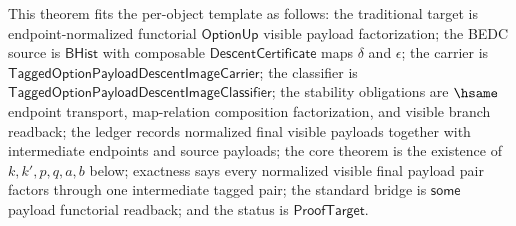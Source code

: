 \begin{theorem}
\label{thm:tagged-option-composite-image-classifier-normalized-visible-payload-factorization}
This theorem fits the per-object template as follows: the traditional target is
endpoint-normalized functorial $\mathsf{OptionUp}$ visible payload
factorization; the BEDC source is $\mathsf{BHist}$ with composable
$\mathsf{DescentCertificate}$ maps $\delta$ and $\epsilon$; the carrier is
$\mathsf{TaggedOptionPayloadDescentImageCarrier}$; the classifier is
$\mathsf{TaggedOptionPayloadDescentImageClassifier}$; the stability obligations
are $\hsame$ endpoint transport, map-relation composition factorization, and
visible branch readback; the ledger records normalized final visible payloads
together with intermediate endpoints and source payloads; the core theorem is
the existence of $k,k',p,q,a,b$ below; exactness says every normalized visible
final payload pair factors through one intermediate tagged pair; the standard
bridge is $\mathsf{some}$ payload functorial readback; and the status is
$\mathsf{ProofTarget}$.


\end{theorem}
